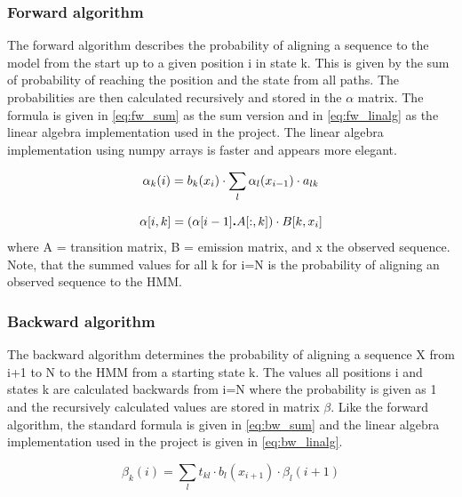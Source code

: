 \subsubsection{Forward algorithm}\label{method.forward}
The forward algorithm describes the probability of aligning a sequence to the model from the start up to a given position i in state k.  This is given by the sum of probability of reaching the position and the state from all paths. The probabilities are then calculated recursively and stored in the $\alpha$ matrix. The formula is given in \autoref{eq:fw_sum} as the sum version and in \autoref{eq:fw_linalg} as the linear algebra implementation used in the project. The linear algebra implementation using numpy arrays is faster and appears more elegant.

\begin{equation}
    \alpha_{k}(i) = b_k(x_i) \cdot \sum_{l} \alpha_l(x_{i-1}) \cdot a_{lk}\\
    \label{eq:fw_sum}
\end{equation}

\begin{equation}
    \alpha[i,k] = (\alpha[i-1]\textbf{.}A[:,k]) \cdot B[k, x_i]\\
    \label{eq:fw_linalg}
\end{equation}
where A = transition matrix, B = emission matrix, and x the observed sequence.\\

\noindent
Note, that the summed values for all k for i=N is the probability of aligning an observed sequence to the HMM.

\subsubsection{Backward algorithm}\label{method.backward}
The backward algorithm determines the probability of aligning a sequence X from i+1 to N to the HMM from a starting state k. The values all positions i and states k are calculated backwards from i=N where the probability is given as 1 and the recursively calculated values are stored in matrix $\beta$. Like the forward algorithm, the standard formula is given in \autoref{eq:bw_sum} and the linear algebra implementation used in the project is given in \autoref{eq:bw_linalg}.

\begin{equation}
    \beta_{k}(i) = \sum_l t_{kl} \cdot b_l(x_{i+1}) \cdot \beta_l(i+1)
    \label{eq:bw_sum}
\end{equation}

